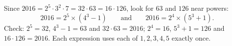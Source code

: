 Since $2016=2^5\cdot3^2\cdot7=32\cdot63=16\cdot126$, look for $63$ and $126$ near powers:
\[\boxed{2016=2^5\times\left(4^3-1\right)}\qquad\text{and}\qquad\boxed{2016=2^4\times\left(5^3+1\right)}.\]
Check: $2^5=32$, $4^3-1=63$ and $32\cdot63=2016$; $2^4=16$, $5^3+1=126$ and $16\cdot126=2016$. Each expression uses each of $1,2,3,4,5$ exactly once.
